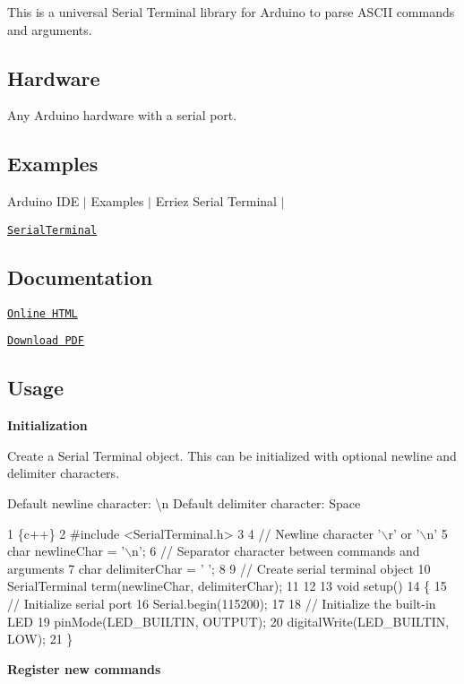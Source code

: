 \href{https://travis-ci.org/Erriez/ErriezSerialTerminal}{\tt }

This is a universal Serial Terminal library for Arduino to parse A\+S\+C\+II commands and arguments.



\subsection*{Hardware}

Any Arduino hardware with a serial port.

\subsection*{Examples}

Arduino I\+DE $\vert$ Examples $\vert$ Erriez Serial Terminal $\vert$


\begin{DoxyItemize}
\item \href{https://github.com/Erriez/ErriezSerialTerminal/blob/master/examples/SerialTerminal/SerialTerminal.ino}{\tt Serial\+Terminal}
\end{DoxyItemize}

\subsection*{Documentation}


\begin{DoxyItemize}
\item \href{https://erriez.github.io/ErriezSerialTerminal}{\tt Online H\+T\+ML}
\item \href{https://github.com/Erriez/ErriezSerialTerminal/raw/gh-pages/latex/ErriezSerialTerminal.pdf}{\tt Download P\+DF}
\end{DoxyItemize}

\subsection*{Usage}

{\bfseries Initialization}

Create a Serial Terminal object. This can be initialized with optional newline and delimiter characters.

Default newline character\+: {\ttfamily \textquotesingle{}\textbackslash{}n\textquotesingle{}} Default delimiter character\+: {\ttfamily Space}


\begin{DoxyCode}
1 \{c++\}
2 #include <SerialTerminal.h>
3 
4 // Newline character '\(\backslash\)r' or '\(\backslash\)n'
5 char newlineChar = '\(\backslash\)n'; 
6 // Separator character between commands and arguments
7 char delimiterChar = ' ';
8 
9 // Create serial terminal object
10 SerialTerminal term(newlineChar, delimiterChar);
11 
12 
13 void setup()
14 \{
15     // Initialize serial port
16     Serial.begin(115200);
17 
18     // Initialize the built-in LED
19     pinMode(LED\_BUILTIN, OUTPUT);
20     digitalWrite(LED\_BUILTIN, LOW);
21 \}
\end{DoxyCode}
 {\bfseries Register new commands}

